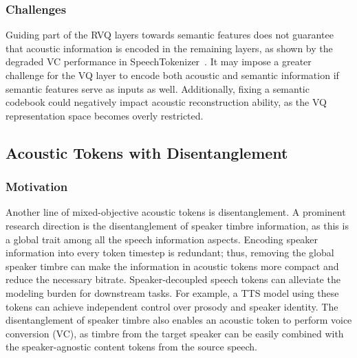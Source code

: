 \subsubsection{Challenges}
Guiding part of the RVQ layers towards semantic features does not guarantee that acoustic information is encoded in the remaining layers, as shown by the degraded VC performance in SpeechTokenizer~\cite{zhang2024speechtokenizer}.
It may impose a greater challenge for the VQ layer to encode both acoustic and semantic information if semantic features serve as inputs as well.
Additionally, fixing a semantic codebook could negatively impact acoustic reconstruction ability, as the VQ representation space becomes overly restricted.

\subsection{Acoustic Tokens with Disentanglement}
\label{sec:acoustic-disen}
\subsubsection{Motivation}
Another line of mixed-objective acoustic tokens is {disentanglement}.
A prominent research direction is the disentanglement of speaker timbre information, as this is a global trait among all the speech information aspects.
Encoding speaker information into every token timestep is redundant; thus, removing the global speaker timbre can make the information in acoustic tokens more compact and reduce the necessary bitrate. 
Speaker-decoupled speech tokens can alleviate the modeling burden for downstream tasks. For example, a TTS model using these tokens can achieve independent control over prosody and speaker identity.
The disentanglement of speaker timbre also enables an acoustic token to perform voice conversion (VC), as timbre from the target speaker can be easily combined with the speaker-agnostic content tokens from the source speech.

